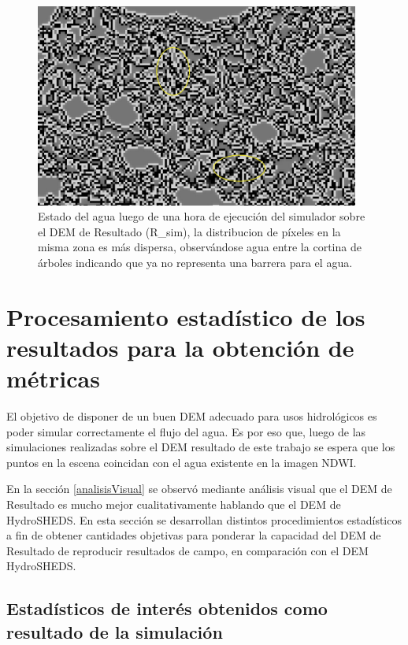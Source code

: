 \documentclass[10pt,a4paper, twoside]{report}
\begin{document}
\begin{figure}[H]
   \centering      
   \includegraphics[width=0.95\textwidth]{imagenes/ResultadoOriginalArbolesEjecucion.jpg}
 \caption{Estado del agua luego de una hora de ejecución del simulador sobre el DEM de Resultado (R\_sim), la distribucion de píxeles en la misma zona es más dispersa, observándose agua entre la cortina de árboles indicando que ya no representa una barrera para el agua.}
 \label{ResultadoOriginalArbolesEjecucion}
\end{figure}

\section{Procesamiento estadístico de los resultados para la obtención de métricas}

El objetivo de disponer de un buen DEM adecuado para usos hidrológicos es poder simular correctamente el flujo del agua. Es por eso que, luego de las simulaciones realizadas sobre el DEM resultado de este trabajo se espera que los puntos en la escena coincidan con el agua existente en la imagen NDWI.

En la sección \ref{analisisVisual} se observó mediante análisis visual que el DEM de Resultado es mucho mejor cualitativamente hablando que el DEM de HydroSHEDS. En esta sección se desarrollan distintos procedimientos estadísticos a fin de obtener cantidades objetivas para ponderar la capacidad del DEM de Resultado de reproducir resultados de campo, en comparación con el DEM HydroSHEDS.  


\subsection{Estadísticos de interés obtenidos como resultado de la simulación}
\end{document}
